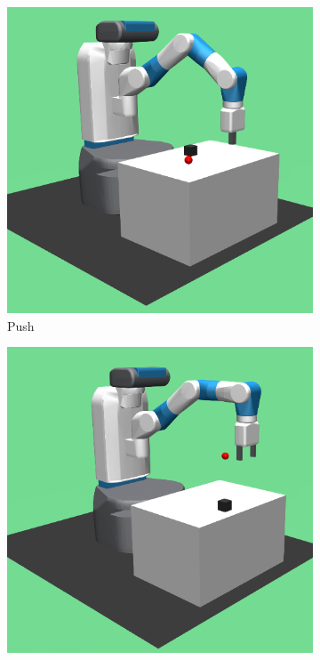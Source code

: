 \begin{figure}
  \begin{subfigure}[t]{0.19\textwidth}
    \includegraphics[width=\textwidth]{figures/chapter4/push_resize.png}
    \caption{Push}
    \label{subfig:env_push}
  \end{subfigure}\hfill
  \begin{subfigure}[t]{0.19\textwidth}
    \includegraphics[width=\textwidth]{figures/chapter4/pick_resize.png}

\end{subfigure}
\end{figure}
